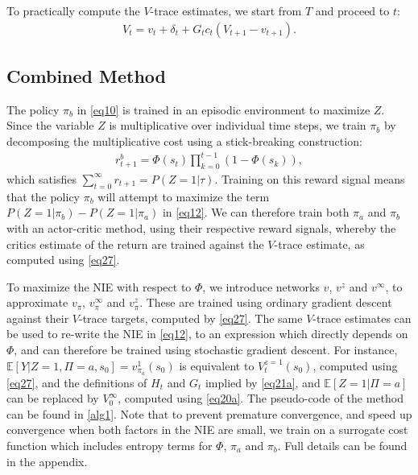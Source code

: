 \documentclass[letterpaper]{article} %
\newcommand{\EE}{\mathbb{E}}
\newcommand{\NIE}{\textrm{NIE}\xspace}
\begin{document}
	To practically compute the $V$-trace estimates, we start from $T$ and proceed to $t$: %
	\begin{align}
		V_t = v_t + \delta_t + G_t c_t (V_{t+1} - v_{t+1}). \label{eq27}
	\end{align}




	\subsection{Combined Method} \label{s25}
	The policy $\pi_b$ in \cref{eq10} is trained in an episodic environment to maximize $Z$. Since the variable $Z$ is multiplicative over individual time steps, we train $\pi_b$ by decomposing the multiplicative cost using a stick-breaking construction:
	\begin{align}
		r_{t+1}^b = \Phi(s_t) \prod_{k=0}^{t-1} (1-\Phi(s_k)), \label{eq41}
	\end{align}
	which satisfies $\sum_{t=0}^\infty r_{t+1} = P(Z=1|\tau)$. Training on this reward signal means that the policy $\pi_b$ will attempt to maximize the term $P(Z=1|\pi_b) - P(Z=1|\pi_a)$ in \cref{eq12}. We can therefore train both $\pi_a$ and $\pi_b$ with an actor-critic method, using their respective reward signals, whereby the critics estimate of the return are trained against the $V$-trace estimate, as computed using \cref{eq27}.



	To maximize the \NIE with respect to $\Phi$, we introduce networks $v$, $v^z$ and $v^\infty$, to approximate $v_\pi$, $v^\infty_\pi$ and $v^z_\pi$. These are trained using ordinary gradient descent against their $V$-trace targets, computed by \cref{eq27}. The same $V$-trace estimates can be used to re-write the \NIE in \cref{eq12}, to an expression which directly depends on $\Phi$, and can therefore be trained using stochastic gradient descent.
	For instance, $\EE[Y|Z=1,\Pi=a,s_0] = v_{\pi_a}^1(s_0)$ is equivalent to $V^{z=1}_t(s_0)$, computed using \cref{eq27}, and the definitions of $H_t$ and $G_t$ implied by \cref{eq21a}, and $\EE\left[Z=1|\Pi= a\right]$ can be replaced by $V_0^\infty$, computed using \cref{eq20a}. The pseudo-code of the method can be found in \cref{alg1}.
	Note that to prevent premature convergence, and speed up convergence when both factors in the \NIE are small, we train on a surrogate cost function which includes entropy terms for $\Phi$, $\pi_a$ and $\pi_b$. Full details can be found in the appendix.
\end{document}
